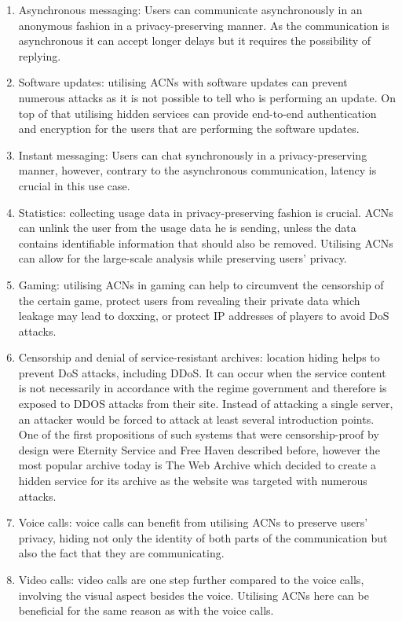 \begin{enumerate}
    \item Asynchronous messaging: Users can communicate asynchronously in an anonymous fashion in a privacy-preserving manner. As the communication is asynchronous it can accept longer delays but it requires the possibility of replying.
    \item Software updates: utilising ACNs with software updates can prevent numerous attacks as it is not possible to tell who is performing an update. On top of that utilising hidden services can provide end-to-end authentication and encryption for the users that are performing the software updates.
    \item Instant messaging: Users can chat synchronously in a privacy-preserving manner, however, contrary to the asynchronous communication, latency is crucial in this use case.
    \item Statistics: collecting usage data in privacy-preserving fashion is crucial. ACNs can unlink the user from the usage data he is sending, unless the data contains identifiable information that should also be removed. Utilising ACNs can allow for the large-scale analysis while preserving users' privacy.
    \item Gaming: utilising ACNs in gaming can help to circumvent the censorship of the certain game, protect users from revealing their private data which leakage may lead to doxxing, or protect IP addresses of players to avoid DoS attacks.
    \item Censorship and denial of service-resistant archives: location hiding helps to prevent DoS attacks, including DDoS. It can occur when the service content is not necessarily in accordance with the regime government and therefore is exposed to DDOS attacks from their site. Instead of attacking a single server, an attacker would be forced to attack at least several introduction points. One of the first propositions of such systems that were censorship-proof by design were Eternity Service and Free Haven described before, however the most popular archive today is The Web Archive which decided to create a hidden service for its archive as the website was targeted with numerous attacks.
    \item Voice calls: voice calls can benefit from utilising ACNs to preserve users’ privacy, hiding not only the identity of both parts of the communication but also the fact that they are communicating.
    \item Video calls: video calls are one step further compared to the voice calls, involving the visual aspect besides the voice. Utilising ACNs here can be beneficial for the same reason as with the voice calls.

\end{enumerate}
